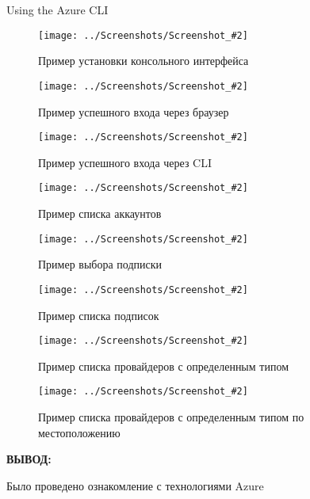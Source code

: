 \documentclass[14pt,a4paper]{extreport}
\newcommand{\screenshot}[2]{\begin{figure}[ht]%
\centering\texttt{[image: ../Screenshots/Screenshot\_\#2]}%
\caption{#1}%
\label{picture#2}%
\end{figure}%
}
\newcommand{\header}[1]{%
{
\fontsize{16pt}{14pt}\selectfont
\begin{center}
\textbf{\MakeUppercase{#1}:}
\end{center}
}
}
\begin{document}
\clearpage
Using the Azure CLI

\screenshot{Пример установки консольного интерфейса}{10}
\screenshot{Пример успешного входа через браузер}{11}
\screenshot{Пример успешного входа через CLI}{12}
\screenshot{Пример списка аккаунтов}{13}
\screenshot{Пример выбора подписки}{14}
\screenshot{Пример списка подписок}{15}
\screenshot{Пример списка провайдеров с определенным типом}{16}
\screenshot{Пример списка провайдеров с определенным типом по местоположению}{17}

\clearpage

\header{Вывод}

Было проведено ознакомление с технологиями Azure
\end{document}
